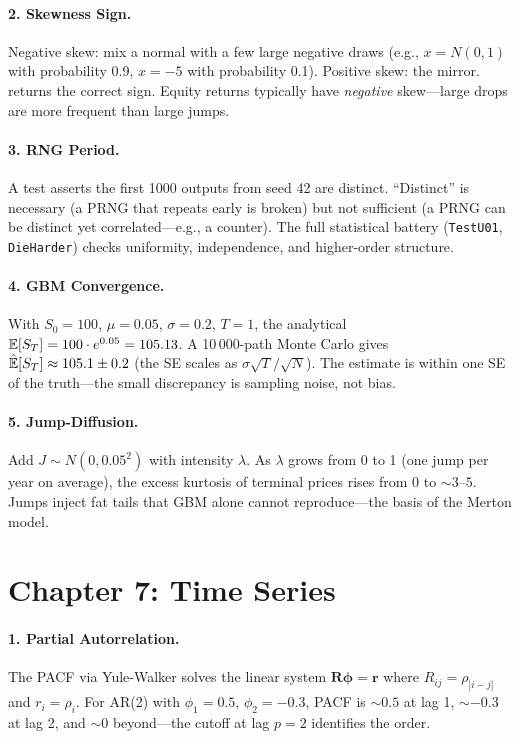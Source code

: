 \paragraph{2. Skewness Sign.}
Negative skew: mix a normal with a few large negative draws
(e.g., $x = N(0,1)$ with probability 0.9, $x = -5$ with probability
0.1). Positive skew: the mirror.  returns the correct
sign. Equity returns typically have \emph{negative} skew---large
drops are more frequent than large jumps.

\paragraph{3. RNG Period.}
A test asserts the first 1000 outputs from seed 42 are distinct.
``Distinct'' is necessary (a PRNG that repeats early is broken) but
not sufficient (a PRNG can be distinct yet correlated---e.g., a
counter). The full statistical battery (\texttt{TestU01},
\texttt{DieHarder}) checks uniformity, independence, and
higher-order structure.

\paragraph{4. GBM Convergence.}
With $S_0 = 100$, $\mu = 0.05$, $\sigma = 0.2$, $T = 1$, the
analytical $\mathbb{E}[S_T] = 100 \cdot e^{0.05} = 105.13$. A 10\,000-path
Monte Carlo gives $\hat{\mathbb{E}}[S_T] \approx 105.1 \pm 0.2$ (the SE
scales as $\sigma \sqrt{T} / \sqrt{N}$). The estimate is within
one SE of the truth---the small discrepancy is sampling noise, not
bias.

\paragraph{5. Jump-Diffusion.}
Add $J \sim N(0, 0.05^2)$ with intensity $\lambda$. As $\lambda$
grows from 0 to 1 (one jump per year on average), the excess
kurtosis of terminal prices rises from 0 to $\sim 3$--$5$. Jumps
inject fat tails that GBM alone cannot reproduce---the basis of
the Merton model.

\section*{Chapter 7: Time Series}

\paragraph{1. Partial Autorrelation.}
The PACF via Yule-Walker solves the linear system
$\mathbf{R} \boldsymbol{\phi} = \mathbf{r}$ where $R_{ij} =
\rho_{|i-j|}$ and $r_i = \rho_i$. For AR(2) with $\phi_1 = 0.5$,
$\phi_2 = -0.3$, PACF is $\sim 0.5$ at lag 1, $\sim -0.3$ at lag 2,
and $\sim 0$ beyond---the cutoff at lag $p = 2$ identifies the
order.

